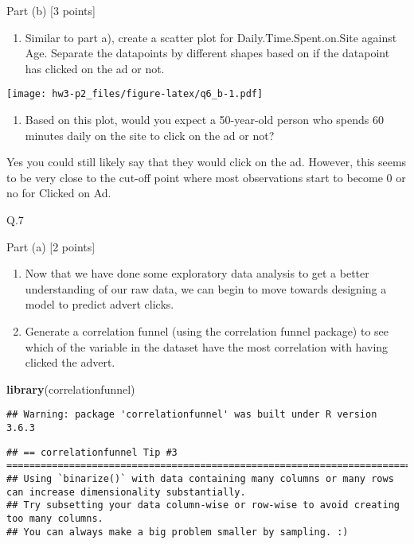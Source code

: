 \documentclass[
]{article}
\newenvironment{Shaded}{\begin{snugshade}}{\end{snugshade}}
\newcommand{\KeywordTok}[1]{\textcolor[rgb]{0.13,0.29,0.53}{\textbf{#1}}}
\newcommand{\NormalTok}[1]{#1}
\providecommand{\tightlist}{%
  \setlength{\itemsep}{0pt}\setlength{\parskip}{0pt}}
\begin{document}
Part (b) {[}3 points{]}

\begin{enumerate}
\def\labelenumi{\arabic{enumi}.}
\tightlist
\item
  Similar to part a), create a scatter plot for Daily.Time.Spent.on.Site
  against Age. Separate the datapoints by different shapes based on if
  the datapoint has clicked on the ad or not.
\end{enumerate}

\texttt{[image: hw3-p2\_files/figure-latex/q6\_b-1.pdf]}

\begin{enumerate}
\def\labelenumi{\arabic{enumi}.}
\setcounter{enumi}{1}
\tightlist
\item
  Based on this plot, would you expect a 50-year-old person who spends
  60 minutes daily on the site to click on the ad or not?
\end{enumerate}

Yes you could still likely say that they would click on the ad. However,
this seems to be very close to the cut-off point where most observations
start to become 0 or no for Clicked on Ad.

Q.7

Part (a) {[}2 points{]}

\begin{enumerate}
\def\labelenumi{\arabic{enumi}.}
\item
  Now that we have done some exploratory data analysis to get a better
  understanding of our raw data, we can begin to move towards designing
  a model to predict advert clicks.
\item
  Generate a correlation funnel (using the correlation funnel package)
  to see which of the variable in the dataset have the most correlation
  with having clicked the advert.
\end{enumerate}

\begin{Shaded}
\begin{Highlighting}[]
\KeywordTok{library}\NormalTok{(correlationfunnel)}
\end{Highlighting}
\end{Shaded}

\begin{verbatim}
## Warning: package 'correlationfunnel' was built under R version 3.6.3
\end{verbatim}

\begin{verbatim}
## == correlationfunnel Tip #3 ================================================================================================
## Using `binarize()` with data containing many columns or many rows can increase dimensionality substantially.
## Try subsetting your data column-wise or row-wise to avoid creating too many columns.
## You can always make a big problem smaller by sampling. :)
\end{verbatim}
\end{document}
